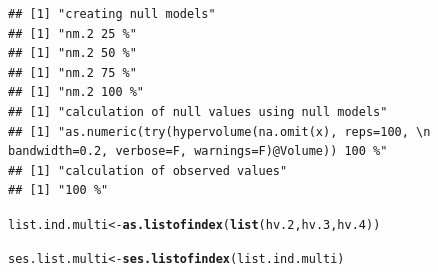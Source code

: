 \documentclass[12pt]{article}\usepackage[]{graphicx}\usepackage[]{color}
\makeatletter
\newcommand{\hlstd}[1]{\textcolor[rgb]{0.345,0.345,0.345}{#1}}%
\newcommand{\hlkwb}[1]{\textcolor[rgb]{0.69,0.353,0.396}{#1}}%
\newcommand{\hlkwd}[1]{\textcolor[rgb]{0.737,0.353,0.396}{\textbf{#1}}}%
\newenvironment{kframe}{%
 \def\at@end@of@kframe{}%
 \ifinner\ifhmode%
  \def\at@end@of@kframe{\end{minipage}}%
  \begin{minipage}{\columnwidth}%
 \fi\fi%
 \def\FrameCommand##1{\hskip\@totalleftmargin \hskip-\fboxsep
 \colorbox{shadecolor}{##1}\hskip-\fboxsep
     \hskip-\linewidth \hskip-\@totalleftmargin \hskip\columnwidth}%
 \MakeFramed {\advance\hsize-\width
   \@totalleftmargin\z@ \linewidth\hsize
   \@setminipage}}%
 {\par\unskip\endMakeFramed%
 \at@end@of@kframe}
\newenvironment{knitrout}{}{} %
\makeatother
\begin{document}
\begin{knitrout}
\begin{kframe}
\begin{verbatim}
## [1] "creating null models"
## [1] "nm.2 25 %"
## [1] "nm.2 50 %"
## [1] "nm.2 75 %"
## [1] "nm.2 100 %"
## [1] "calculation of null values using null models"
## [1] "as.numeric(try(hypervolume(na.omit(x), reps=100, \n                                  bandwidth=0.2, verbose=F, warnings=F)@Volume)) 100 %"
## [1] "calculation of observed values"
## [1] "100 %"
\end{verbatim}
\begin{alltt}
\hlstd{list.ind.multi}\hlkwb{<-}\hlkwd{as.listofindex}\hlstd{(}\hlkwd{list}\hlstd{(hv.2, hv.3, hv.4))}

\hlstd{ses.list.multi}\hlkwb{<-}\hlkwd{ses.listofindex}\hlstd{(list.ind.multi)}
\end{alltt}
\end{kframe}
\end{knitrout}
\end{document}
